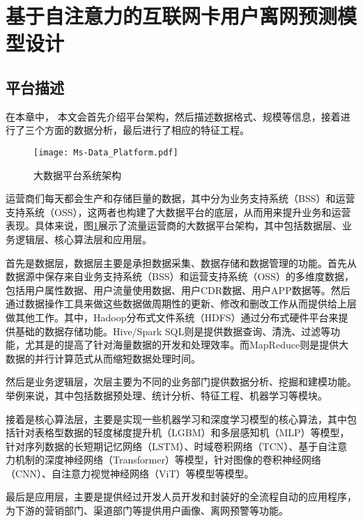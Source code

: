 \section{基于自注意力的互联网卡用户离网预测模型设计}
\subsection{平台描述}
在本章中， 本文会首先介绍平台架构，然后描述数据格式、规模等信息，接着进行了三个方面的数据分析，最后进行了相应的特征工程。
\begin{figure}[hbt]
	\centering
	\texttt{[image: Ms-Data\_Platform.pdf]}
	\caption{大数据平台系统架构}
	\label{Fig:Data-Platform}
\end{figure}

运营商们每天都会生产和存储巨量的数据，其中分为业务支持系统（BSS）和运营支持系统（OSS），这两者也构建了大数据平台的底层，从而用来提升业务和运营表现。具体来说，图\ref{Fig:Data-Platform}展示了流量运营商的大数据平台架构，其中包括数据层、业务逻辑层、核心算法层和应用层。\par
首先是数据层，数据层主要是承担数据采集、数据存储和数据管理的功能。首先从数据源中保存来自业务支持系统（BSS）和运营支持系统（OSS）的多维度数据，包括用户属性数据、用户流量使用数据、用户CDR数据、用户APP数据等。然后通过数据操作工具来做这些数据做周期性的更新、修改和删改工作从而提供给上层做其他工作。其中，Hadoop分布式文件系统（HDFS）通过分布式硬件平台来提供基础的数据存储功能。Hive/Spark SQL则是提供数据查询、清洗、过滤等功能，尤其是的提高了针对海量数据的开发和处理效率。而MapReduce则是提供大数据的并行计算范式从而缩短数据处理时间。\par
然后是业务逻辑层，次层主要为不同的业务部门提供数据分析、挖掘和建模功能。举例来说，其中包括数据预处理、统计分析、特征工程、机器学习等模块。\par
接着是核心算法层，主要是实现一些机器学习和深度学习模型的核心算法，其中包括针对表格型数据的轻度梯度提升机（LGBM）和多层感知机（MLP）等模型，针对序列数据的长短期记忆网络（LSTM）、时域卷积网络（TCN）、基于自注意力机制的深度神经网络（Transformer）等模型，针对图像的卷积神经网络（CNN）、自注意力视觉神经网络（ViT）等模型等模型。\par
最后是应用层，主要是提供经过开发人员开发和封装好的全流程自动的应用程序，为下游的营销部门、渠道部门等提供用户画像、离网预警等功能。

